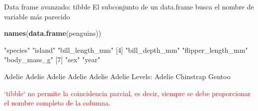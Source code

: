 \documentclass[
  ignorenonframetext,
  aspectratio=169]{beamer}
\newenvironment{Shaded}{\begin{snugshade}}{\end{snugshade}}
\newcommand{\FunctionTok}[1]{\textcolor[rgb]{0.13,0.29,0.53}{\textbf{#1}}}
\newcommand{\NormalTok}[1]{#1}
\newcommand{\SpecialCharTok}[1]{\textcolor[rgb]{0.81,0.36,0.00}{\textbf{#1}}}
\let\oldverbatim\verbatim
\let\endoldverbatim\endverbatim
\renewenvironment{verbatim}{\tiny\oldverbatim}{\endoldverbatim}
\newcommand\red[1]{\textcolor{red}{#1}}
\begin{document}
\begin{frame}[fragile]{Data frame avanzado: tibble}
\label{data-frame-avanzado-tibble-9}
El subconjunto de un data.frame busca el nombre de variable más parecido

\begin{Shaded}
\begin{Highlighting}[]
\FunctionTok{names}\NormalTok{(}\FunctionTok{data.frame}\NormalTok{(penguins))}
\end{Highlighting}
\end{Shaded}

\begin{verbatim}
[1] "species"           "island"            "bill_length_mm"   
[4] "bill_depth_mm"     "flipper_length_mm" "body_mass_g"      
[7] "sex"               "year"             
\end{verbatim}

\begin{Shaded}
\end{Shaded}

\begin{verbatim}
[1] Adelie Adelie Adelie Adelie Adelie Adelie
Levels: Adelie Chinstrap Gentoo
\end{verbatim}

\red{`tibble` no permite la coincidencia parcial, es decir, siempre se debe proporcionar el nombre completo de la columna.}
\end{frame}
\end{document}
